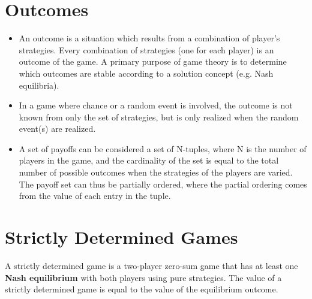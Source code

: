 \documentclass[a4paper,12pt]{article}
\begin{document}
\section{Outcomes}
\begin{itemize}
	\item An outcome is a situation which results from a combination of player's strategies. Every combination of strategies (one for each player) is an outcome of the game. A primary purpose of game theory is to determine which outcomes are stable according to a solution concept (e.g. Nash equilibria).
	\item 
	In a game where chance or a random event is involved, the outcome is not known from only the set of strategies, but is only realized when the random event(s) are realized.
	\item 
	A set of payoffs can be considered a set of N-tuples, where N is the number of players in the game, and the cardinality of the set is equal to the total number of possible outcomes when the strategies of the players are varied. The payoff set can thus be partially ordered, where the partial ordering comes from the value of each entry in the tuple. 
\end{itemize}

\section{Strictly Determined Games}
A strictly determined game is a two-player zero-sum game that has at least one \textbf{Nash equilibrium} with both players using pure strategies. The value of a strictly determined game is equal to the value of the equilibrium outcome.
\end{document}
